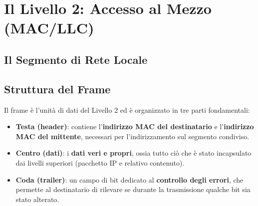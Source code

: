 \section{Il Livello 2: Accesso al Mezzo (MAC/LLC)}

\subsection{Il Segmento di Rete Locale}


\subsection{Struttura del Frame}
Il frame è l'unità di dati del Livello 2 ed è organizzato in tre parti fondamentali:
\begin{itemize}
    \item \textbf{Testa (header)}: contiene l'\textbf{indirizzo MAC del destinatario} e l'\textbf{indirizzo MAC del mittente}, necessari per l'indirizzamento sul segmento condiviso.
    \item \textbf{Centro (dati)}: i \textbf{dati veri e propri}, ossia tutto ciò che è stato incapsulato dai livelli superiori (pacchetto IP e relativo contenuto).
    \item \textbf{Coda (trailer)}: un campo di bit dedicato al \textbf{controllo degli errori}, che permette al destinatario di rilevare se durante la trasmissione qualche bit sia stato alterato.
\end{itemize}

